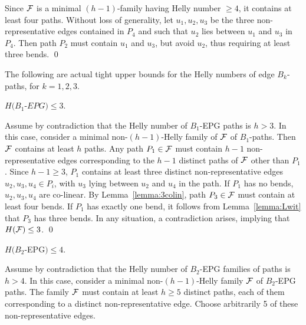 \proof
Since $\cal{F}$ is a minimal $(h-1)$-family having Helly number $\geq 4$, it contains at least four paths. Without loss of generality, let  $u_1, u_2, u_3$ be the three non-representative edges contained in $P_4$ and such that  $u_2$ lies between $u_1$ and $u_3$ in $P_4$. Then path $P_2$ must contain $u_1$ and $u_3$, but avoid $u_2$, thus requiring at least three bends.  
\qed

The following are actual  tight upper bounds for the Helly numbers of edge $B_k$-paths, for $k = 1,2,3$.

\begin{lema}\label{claim:upper-B1}
$H(B_1$-$EPG) \leq 3.$
\end{lema}
 
\proof
Assume by contradiction that the Helly number of $B_1$-EPG paths is $h > 3$. In this case, consider a minimal non-$(h-1)$-Helly family of $\cal F$ of $B_1$-paths. Then $\cal F$ contains at least $h$ paths.  
Any path $P_1 \in \cal{F}$ must contain $h-1$ non-representative edges  corresponding to the $h-1$ distinct paths of $\cal F$ other than $P_1$. Since $h-1 \geq 3$, $P_1$ contains at least three distinct non-representative edges $u_2, u_3, u_4 \in P_i$, with $u_3$ lying  between $u_2$ and $u_4$ in the path.   If $P_1$ has no bends, $u_2,u_3,u_4$ are co-linear. By Lemma~\ref{lemma:3colin},  path $P_3 \in \cal{F}$ must contain at least four bends. If $P_1$ has exactly one bend, it follows from Lemma~\ref{lemma:Lwit} that $P_3$ has three bends. In any situation, a contradiction arises, implying that $H({\cal F}) \leq 3$.
\qed

\begin{lema}\label{claim:upper-B2}
$H(B_2$-EPG$) \leq 4.$
\end{lema}

\proof
Assume by contradiction that the Helly number of  $B_2$-EPG families of paths is $h > 4$. In this case, consider a minimal non-$(h-1)$-Helly family $\cal F$ of $B_2$-EPG paths. The family  $\cal F$ must contain at least $h \geq 5$ distinct paths, each of them corresponding to a distinct non-representative  edge. Choose arbitrarily 5 of these non-representative edges.


